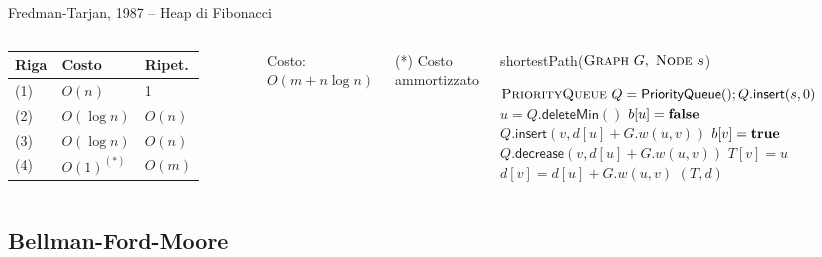 \vspace{-9pt}
\begin{frame}{Fredman-Tarjan, 1987 -- Heap di Fibonacci}



\begin{columns}

\begingroup
\renewcommand*{\arraystretch}{1.2}
\begin{tabular}{|l|l|l|}
\hline
Riga & Costo & Ripet. \\\hline
(1) & $O(n)$ & 1 \\\hline
(2) & $O(\log n)$ & $O(n)$ \\\hline
(3) & $O(\log n)$ & $O(n)$ \\\hline
(4) & $O(1)^{(*)}$ & $O(m)$ \\\hline
\end{tabular}
\endgroup

\medskip
Costo: \alert{$O(m + n \log n)$}

\medskip
(*) Costo ammortizzato

\vspace{-12pt}
\tiny
\begin{Procedure}
\caption[A]{\textsf{shortestPath}($\textsc{Graph}\ G,\ \textsc{Node}\ s$)}
\alert{$\textsc{PriorityQueue}\ Q = \textsf{PriorityQueue}(); Q.\textsf{insert}(s, 0)$}\;
{
  \alert{$u = Q.\textsf{deleteMin}()$}\;
  $b[u] = \FALSE$\;
  {
    {
      {
        \alert{$Q.\textsf{insert}(v, d[u]+G.w(u,v))$}\;
        $b[v] = \TRUE$\;
      }
      {
        \alert{$Q.\textsf{decrease}(v, d[u]+G.w(u,v))$}
      }
      $T[v] = u$\;
      $d[v] = d[u] + G.w(u,v)$\;
    }
  }
}
\Return $(T,d)$
\end{Procedure}
\end{columns}

\end{frame}

\subsection{Bellman-Ford-Moore}


